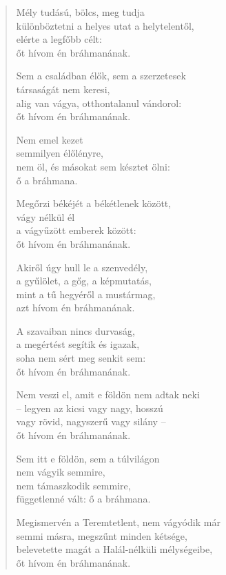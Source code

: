 \begin{verse}
 Mély tudású, bölcs, meg tudja\\
különböztetni a helyes utat a helytelentől,\\
elérte a legfőbb célt:\\
őt hívom én bráhmanának.

 Sem a családban élők, sem a szerzetesek\\
társaságát nem keresi,\\
alig van vágya, otthontalanul vándorol:\\
őt hívom én bráhmanának.

 Nem emel kezet\\
semmilyen élőlényre,\\
nem öl, és másokat sem késztet ölni:\\
ő a bráhmana.

 Megőrzi békéjét a békétlenek között,\\
vágy nélkül él\\
a vágyűzött emberek között:\\
őt hívom én bráhmanának.

 Akiről úgy hull le a szenvedély,\\
a gyűlölet, a gőg, a képmutatás,\\
mint a tű hegyéről a mustármag,\\
azt hívom én bráhmanának.

 A szavaiban nincs durvaság,\\
a megértést segítik és igazak,\\
soha nem sért meg senkit sem:\\
őt hívom én bráhmanának.

 Nem veszi el, amit e földön nem adtak neki\\
– legyen az kicsi vagy nagy, hosszú\\
vagy rövid, nagyszerű vagy silány –\\
őt hívom én bráhmanának.

 Sem itt e földön, sem a túlvilágon\\
nem vágyik semmire,\\
nem támaszkodik semmire,\\
függetlenné vált: ő a bráhmana.

 Megismervén a Teremtetlent, nem vágyódik már\\
semmi másra, megszűnt minden kétsége,\\
belevetette magát a Halál-nélküli mélységeibe,\\
őt hívom én bráhmanának.


\end{verse}
